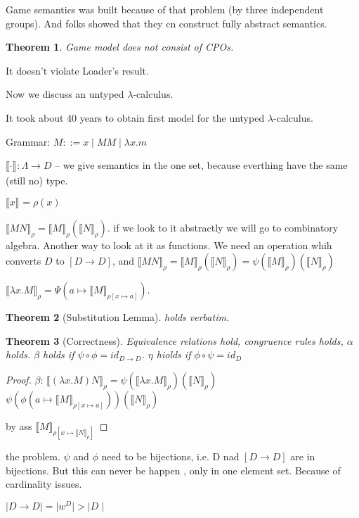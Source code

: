 \documentclass[a4paper,10pt]{book}
\newtheorem{theorem}{Theorem}
\newcommand{\sem}[2]{ \llbracket#1\rrbracket_{#2} }
\newcommand{\rarr}{ \rightarrow }
\begin{document}
Game semantics was built because of that problem (by three independent groups). And folks
showed that they cn construct fully abstract semantics.
\begin{theorem}
Game model does not consist of CPOs.
\end{theorem}
It doesn't violate Loader's result.


Now we discuss an untyped $\lambda$-calculus.

It took about 40 years to obtain first model for the untyped $\lambda$-calculus.

Grammar: $M ::= x \mid MM \mid \lambda x . m$

$\sem{\cdot}{}: \Lambda \rarr D$ -- we give semantics in the one set, because everthing have the
same (still no) type.

$\sem{x}{} = \rho(x)$

$\sem{MN}{\rho} = \sem{M}{\rho} ( \sem{N}{\rho})$. if we look to it abstractly we will go to 
combinatory algebra. Another way to look at it as functions. We need an operation whih converts
$D$ to $[D\rarr D]$, and $\sem{MN}{\rho} = \sem{M}{\rho} ( \sem{N}{\rho}) = \psi (\sem{M}{\rho})( \sem{N}{\rho})$

$\sem{\lambda x. M}{\rho} = \Psi(a \mapsto \sem{M}{\rho[x\mapsto a]}).$


\begin{theorem}[Substitution Lemma]
 holds verbatim.
\end{theorem}

\begin{theorem}[Correctness]
 Equivalence relations hold, congruence rules holds, $\alpha$ holds.
 $\beta$ holds if $\psi \circ \phi = id_{D\rarr D}$. 
 $\eta$ hiolds if $\phi \circ \psi = id_D$
\end{theorem}

\begin{proof}
 $\beta$: $\sem{(\lambda x . M)N}{\rho} = \psi (\sem{\lambda x . M}{\rho})(\sem{N}{\rho})$
 $\psi (\phi (a \mapsto \sem{M}{\rho[x \mapsto a]}))(\sem{N}{\rho})$

 by ass %
 $\sem{M}{\rho[x\mapsto \sem{N}{\rho}]}$
\end{proof}

the problem. $\psi$ and $\phi$ need to be bijections, i.e. D nad $[D\rarr D]$ are in bijections.
But this can never be happen , only in one element set. Because of cardinality issues.

$\mid D\rarr D\mid  = \mid w^D\mid > \mid D \mid$
\end{document}
